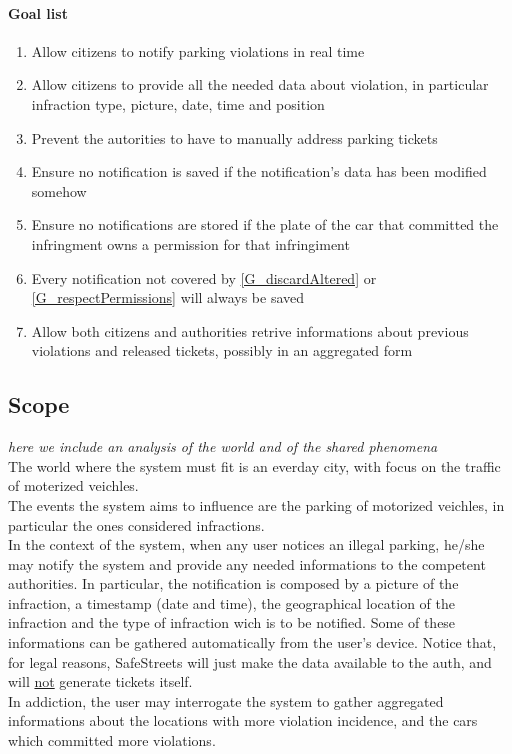 \documentclass{article}
\newcommand{\enum}[1]{\texttt{#1.\arabic*}}
\begin{document}
\paragraph{Goal list}
\begin{enumerate}[label=\enum{G}]
	\item  \label{G_realTime}Allow citizens to notify parking violations in real time
	\item \label{G_allData}Allow citizens to provide all the needed data about violation, in particular infraction type, picture, date, time and position
	\item Prevent the autorities to have to manually address parking tickets
	\item \label{G_discardAltered} Ensure no notification is saved if the notification's data has been modified somehow
	\item \label{G_respectPermissions} Ensure no notifications are stored if the plate of the car that committed the infringment owns a permission for that infringiment
	\item \label{G_storeFine} Every notification not covered by \ref{G_discardAltered} or \ref{G_respectPermissions} will always be saved
	\item \label{G_statistics}Allow both citizens and authorities retrive informations about previous violations and released tickets, possibly in an aggregated form 
\end{enumerate}

	\subsection{Scope} \textit{here we include an analysis of the world and of the shared phenomena}\\
	The world where the system must fit is an everday city, with focus on the traffic of moterized veichles.\\
	The events the system aims to influence are the parking of motorized veichles,  in particular the ones considered infractions.\\
	In the context of the system, when any user notices an illegal parking, he/she may notify the system and provide any needed informations to the competent authorities. In particular, the notification is composed by a picture of the infraction, a timestamp (date and time), the geographical location of the infraction and the type of infraction wich is to be notified. Some of these informations can be gathered automatically from the user's device. Notice that, for legal reasons, SafeStreets will just make the data available to the auth, and will \underline{not} generate tickets itself. \\
	In addiction, the user may interrogate the system to gather aggregated informations about the locations with more violation incidence, and the cars which committed more violations. 
	
\end{document}
